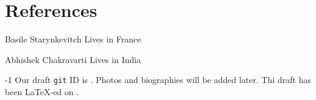 \documentclass{IEEEtran}
\begin{document}



\section*{References}

%
%

%
%

\medskip

% 

\begin{IEEEbiographynophoto}{Basile Starynkevitch}
Lives in France
\end{IEEEbiographynophoto}

\begin{IEEEbiographynophoto}{Abhishek Chakravarti}
Lives in India
\end{IEEEbiographynophoto}








\begin{flushright}
  \begin{relsize}{-1}
    Our draft \texttt{git} ID is \texttt{\textit{\rpsgitcommit}}. Photos and biographies will be added later. Thi draft has been \LaTeX-ed on \textit{\rpstimestamp}.
  \end{relsize}
\end{flushright}

\end{document}
